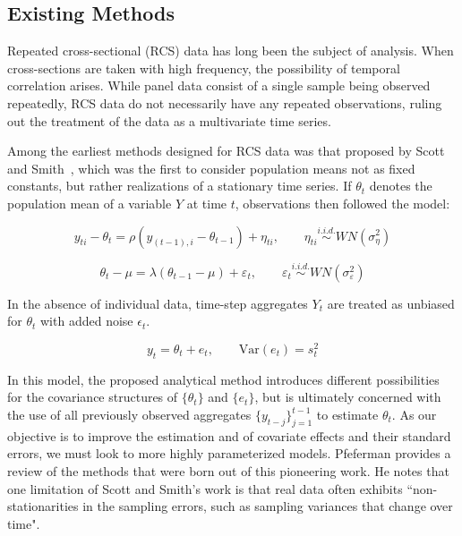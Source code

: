 \subsection{Existing Methods}


Repeated cross-sectional (RCS) data has long been the subject 
of analysis. When cross-sections are taken with high frequency, the 
possibility of temporal correlation arises. While panel data consist 
of a single sample being observed repeatedly, RCS data do not 
necessarily have any repeated observations, ruling out the treatment 
of the data as a multivariate time series. 


Among the earliest methods designed for RCS data was that proposed by Scott and Smith~\cite{scott1974repeatedsurveys}, 
which was the first to consider population means not as fixed constants, but rather realizations of 
a stationary time series. If $\theta_t$ denotes the population mean of a variable $Y$ at time $t$, observations then followed the model:

\begin{equation}
  y_{ti} - \theta_t = \rho (y_{(t-1),i} - \theta_{t-1}) + \eta_{ti}, \qquad \eta_{ti} \overset{i.i.d.}{\sim} WN(\sigma_\eta^2)
  \label{eq:scottsmith1}
\end{equation}

\begin{equation}
  \theta_t - \mu = \lambda(\theta_{t-1} - \mu) + \varepsilon_t, \qquad \varepsilon_t \overset{i.i.d.}{\sim}WN(\sigma_\varepsilon^2)
  \label{eq:scottsmith2}
\end{equation}

In the absence of individual data, time-step aggregates $Y_t$ are treated as unbiased for $\theta_t$ with added noise $\epsilon_t$.


\begin{equation}
    \label{eq:scott}
    y_t = \theta_t + e_t, \qquad \text{Var}(e_t) = s_t^2
\end{equation}

In this model, the proposed analytical method introduces different possibilities for the covariance structures of $\{\theta_t\}$ and $\{e_t\}$, but is ultimately concerned with the use of all previously observed aggregates $\{y_{t-j}\}_{j=1}^{t-1}$ to estimate $\theta_t$. As our objective is to improve the estimation and of covariate effects and their standard errors, we must look to more highly parameterized models.
Pfeferman \cite{Pfeffermann2022} provides a review of the methods that were born out of this pioneering work.
He notes that one limitation of Scott and Smith's work is that real data often exhibits ``non-stationarities in the sampling errors, such as sampling variances
that change over time".

